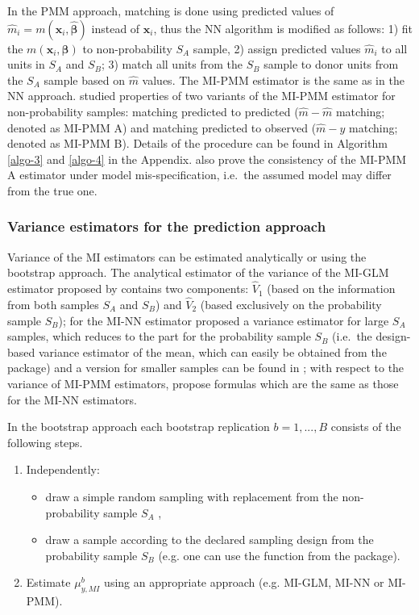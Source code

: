 \documentclass[
]{jss}
\begin{document}
In the PMM approach, matching is done using predicted values of
\(\hat{m}_i=m\left(\boldsymbol{x}_i, \hat{\boldsymbol{\beta}}\right)\)
instead of \(\boldsymbol{x}_i\), thus the NN algorithm is modified as
follows: 1) fit the
\(m\left(\boldsymbol{x}_i, \boldsymbol{\beta}\right)\) to
non-probability \(S_A\) sample, 2) assign predicted values \(\hat{m}_i\)
to all units in \(S_A\) and \(S_B\); 3) match all units from the \(S_B\)
sample to donor units from the \(S_A\) sample based on \(\hat{m}\)
values. The MI-PMM estimator is the same as in the NN approach.
\citet{chlebicki2025} studied properties of two variants of the MI-PMM
estimator for non-probability samples: matching predicted to predicted
(\(\hat{m}-\hat{m}\) matching; denoted as MI-PMM A) and matching
predicted to observed (\(\hat{m}-y\) matching; denoted as MI-PMM B).
Details of the procedure can be found in Algorithm \ref{algo-3} and
\ref{algo-4} in the Appendix. \citet{chlebicki2025} also prove the
consistency of the MI-PMM A estimator under model mis-specification,
i.e.~the assumed model may differ from the true one.

\subsubsection{Variance estimators for the prediction
approach}\label{variance-estimators-for-the-prediction-approach}

Variance of the MI estimators can be estimated analytically or using the
bootstrap approach. The analytical estimator of the variance of the
MI-GLM estimator proposed by \citet[p. 950]{kim_combining_2021} contains
two components: \(\hat{V}_1\) (based on the information from both
samples \(S_A\) and \(S_B\)) and \(\hat{V}_2\) (based exclusively on the
probability sample \(S_B\)); for the MI-NN estimator
\citet{yang2021integration} proposed a variance estimator for large
\(S_A\) samples, which reduces to the part for the probability sample
\(S_B\) (i.e.~the design-based variance estimator of the mean, which can
easily be obtained from the  package) and a version for
smaller samples can be found in \citet{chlebicki2025}; with respect to
the variance of MI-PMM estimators, \citet{chlebicki2025} propose
formulas which are the same as those for the MI-NN estimators.

In the bootstrap approach each bootstrap replication \(b=1,...,B\)
consists of the following steps.

\begin{enumerate}
\item Independently:
  \begin{itemize}
  \item draw a simple random sampling with replacement from the non-probability sample $S_A$ ,
  \item draw a sample according to the declared sampling design from the probability sample $S_B$ (e.g. one can use the  function from the  package).
  \end{itemize}
\item Estimate $\mu_{y, MI}^b$ using an appropriate approach (e.g. MI-GLM, MI-NN or MI-PMM).
\end{enumerate}
\end{document}
